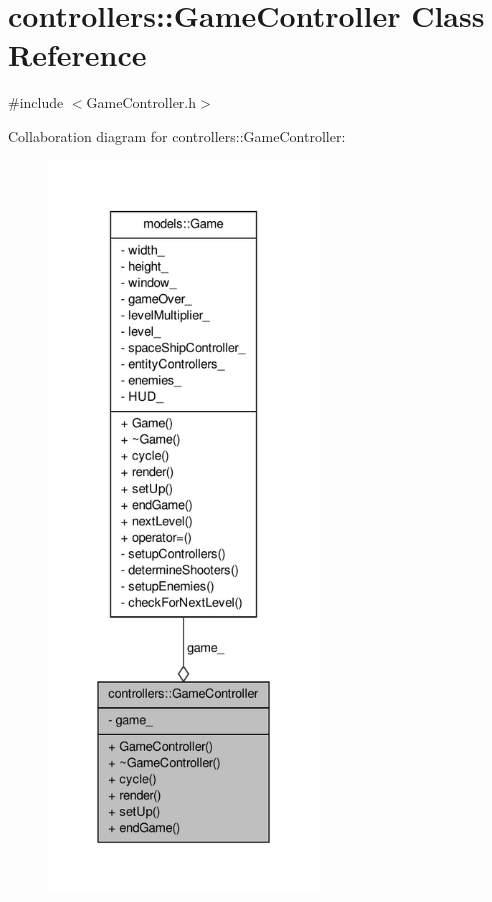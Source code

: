 \hypertarget{classcontrollers_1_1GameController}{\section{controllers\-:\-:\-Game\-Controller \-Class \-Reference}
\label{d9/d54/classcontrollers_1_1GameController}
}


{\ttfamily \#include $<$\-Game\-Controller.\-h$>$}



\-Collaboration diagram for controllers\-:\-:\-Game\-Controller\-:
\nopagebreak
\begin{figure}[H]
\begin{center}
\leavevmode
\includegraphics[height=550pt]{d5/db8/classcontrollers_1_1GameController__coll__graph}
\end{center}
\end{figure}
